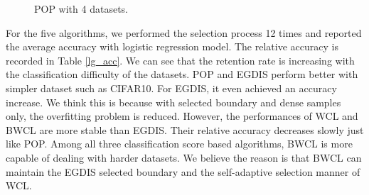  \begin{figure}
\centering  
{}
\caption{POP with 4 datasets.}
\label{Fig.pop_count}
\end{figure}

For the five algorithms, we performed the selection process 12 times and reported the average accuracy with logistic regression model. The relative accuracy is recorded in Table \ref{lg_acc}. We can see that the retention rate is increasing with the classification difficulty of the datasets. POP and EGDIS perform better with simpler dataset such as CIFAR10. For EGDIS, it even achieved an accuracy increase. We think this is because with selected boundary and dense samples only, the overfitting problem is reduced. However, the performances of WCL and BWCL are more stable than EGDIS. Their relative accuracy decreases slowly just like POP. Among all three classification score based algorithms, BWCL is more capable of dealing with harder datasets. We believe the reason is that BWCL can maintain the EGDIS selected boundary and the self-adaptive selection manner of WCL.
 
